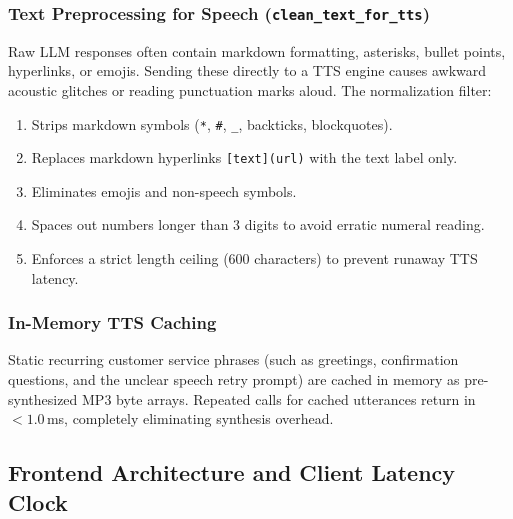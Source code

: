 \subsubsection{Text Preprocessing for Speech (\texttt{clean\_text\_for\_tts})}
Raw LLM responses often contain markdown formatting, asterisks, bullet points, hyperlinks, or emojis. Sending these directly to a TTS engine causes awkward acoustic glitches or reading punctuation marks aloud. The normalization filter:
\begin{enumerate}
    \item Strips markdown symbols (\texttt{*}, \texttt{\#}, \texttt{\_}, backticks, blockquotes).
    \item Replaces markdown hyperlinks \texttt{[text](url)} with the text label only.
    \item Eliminates emojis and non-speech symbols.
    \item Spaces out numbers longer than 3 digits to avoid erratic numeral reading.
    \item Enforces a strict length ceiling (600 characters) to prevent runaway TTS latency.
\end{enumerate}

\subsubsection{In-Memory TTS Caching}
Static recurring customer service phrases (such as greetings, confirmation questions, and the unclear speech retry prompt) are cached in memory as pre-synthesized MP3 byte arrays. Repeated calls for cached utterances return in $< 1.0$\,ms, completely eliminating synthesis overhead.

\subsection{Frontend Architecture and Client Latency Clock}
\label{subsec:frontend_design}

